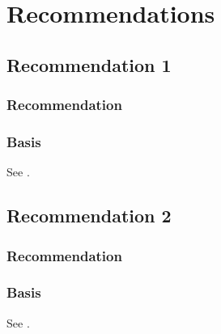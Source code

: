 \chapter{Recommendations}
\label{ch:recommendations}


\section{Recommendation 1}
\label{sec:rec:1}

\subsection{Recommendation}
\lipsum[1][1]

\subsection{Basis}
See .

\section{Recommendation 2}
\label{sec:rec:2}

\subsection{Recommendation}
\lipsum[2][1]

\subsection{Basis}
See .

